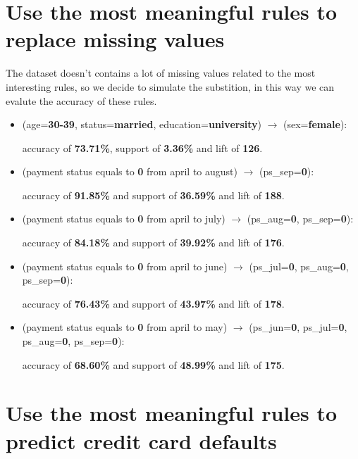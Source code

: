 \section{Use the most meaningful rules to replace missing values}

The dataset doesn't contains a lot of missing values related to the most interesting rules, so we decide to simulate the substition, in this way we can evalute the accuracy of these rules.

\begin{itemize}
  \item (age=\textbf{30-39}, status=\textbf{married}, education=\textbf{university}) $\rightarrow$ (sex=\textbf{female}):
  
    \tab accuracy of \textbf{73.71\%}, support of \textbf{3.36\%} and lift of \textbf{126}.
    
  \item (payment status equals to \textbf{0} from april to august) $\rightarrow$ (ps\_sep=\textbf{0}):
  
    \tab accuracy of \textbf{91.85\%} and support of \textbf{36.59\%} and lift of \textbf{188}.

  \item (payment status equals to \textbf{0} from april to july) $\rightarrow$ (ps\_aug=\textbf{0}, ps\_sep=\textbf{0}):
  
    \tab accuracy of \textbf{84.18\%} and support of \textbf{39.92\%} and lift of \textbf{176}.

  \item (payment status equals to \textbf{0} from april to june) $\rightarrow$ (ps\_jul=\textbf{0}, ps\_aug=\textbf{0}, ps\_sep=\textbf{0}):
  
    \tab accuracy of \textbf{76.43\%} and support of \textbf{43.97\%} and lift of \textbf{178}.

  \item (payment status equals to \textbf{0} from april to may) $\rightarrow$ (ps\_jun=\textbf{0}, ps\_jul=\textbf{0}, ps\_aug=\textbf{0}, ps\_sep=\textbf{0}):
  
    \tab accuracy of \textbf{68.60\%} and support of \textbf{48.99\%} and lift of \textbf{175}.

\end{itemize}

\clearpage

\section{Use the most meaningful rules to predict credit card defaults}

